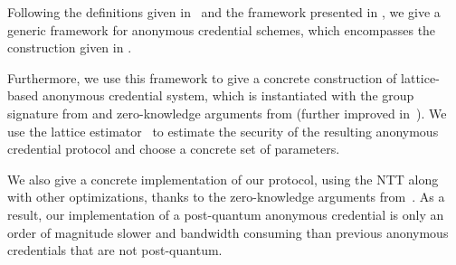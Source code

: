  Following the definitions given 
in~\cite{ISC:BosCamNev18} and the framework presented in 
\cite{CCS:delLyuSei18}, we give a generic framework for anonymous 
credential schemes, which encompasses the construction given in 
\cite{ISC:BosCamNev18}.

Furthermore, we use this framework to give a concrete construction of 
lattice-based anonymous credential system, which is instantiated with 
the group signature from \cite{CCS:delLyuSei18} and zero-knowledge 
arguments from \cite{C:AttLyuSei20} (further improved 
in~\cite{C:LyuNguPla22}). We use the lattice 
estimator~\cite{DBLP:journals/jmc/AlbrechtPS15} to estimate the security 
of the resulting anonymous credential protocol and choose a concrete set 
of parameters.

We also give a concrete implementation of our protocol, using the NTT 
along with other optimizations, thanks to the zero-knowledge arguments 
from~\cite{C:AttLyuSei20}. As a result, our implementation of a 
post-quantum anonymous credential is only an order of magnitude slower 
and bandwidth consuming than previous anonymous credentials that are not 
post-quantum. 




